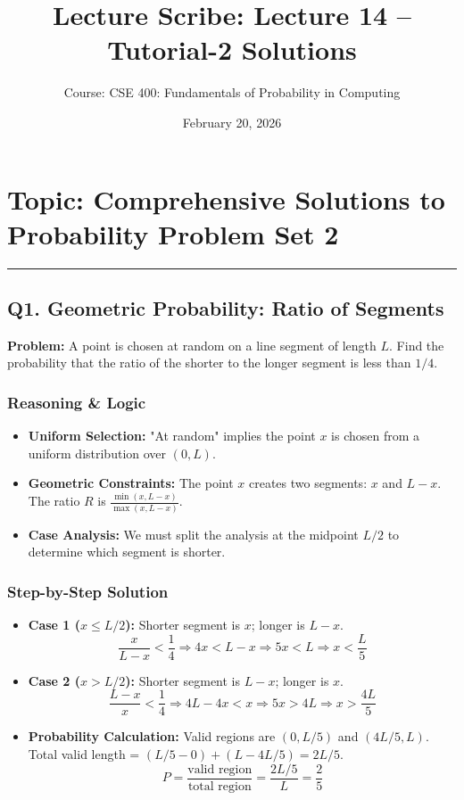 \documentclass[11pt]{article}
\title{Lecture Scribe: Lecture 14 – Tutorial-2 Solutions}
\author{Course: CSE 400: Fundamentals of Probability in Computing}
\date{February 20, 2026}
\begin{document}
\maketitle

\section*{Topic: Comprehensive Solutions to Probability Problem Set 2}
\hrule
\vspace{0.5cm}

\subsection*{Q1. Geometric Probability: Ratio of Segments}

\textbf{Problem:} A point is chosen at random on a line segment of length $L$. Find the probability that the ratio of the shorter to the longer segment is less than $1/4$.

\subsubsection*{Reasoning \& Logic}
\begin{itemize}
    \item \textbf{Uniform Selection:} "At random" implies the point $x$ is chosen from a uniform distribution over $(0, L)$.
    \item \textbf{Geometric Constraints:} The point $x$ creates two segments: $x$ and $L-x$. The ratio $R$ is $\frac{\min(x, L-x)}{\max(x, L-x)}$.
    \item \textbf{Case Analysis:} We must split the analysis at the midpoint $L/2$ to determine which segment is shorter.
\end{itemize}

\subsubsection*{Step-by-Step Solution}
\begin{itemize}
    \item \textbf{Case 1 ($x \le L/2$):} Shorter segment is $x$; longer is $L-x$. 
    \[ \frac{x}{L-x} < \frac{1}{4} \Rightarrow 4x < L - x \Rightarrow 5x < L \Rightarrow x < \frac{L}{5} \]
    \item \textbf{Case 2 ($x > L/2$):} Shorter segment is $L-x$; longer is $x$. 
    \[ \frac{L-x}{x} < \frac{1}{4} \Rightarrow 4L - 4x < x \Rightarrow 5x > 4L \Rightarrow x > \frac{4L}{5} \]
    \item \textbf{Probability Calculation:} Valid regions are $(0, L/5)$ and $(4L/5, L)$. Total valid length = $(L/5 - 0) + (L - 4L/5) = 2L/5$. 
    \[ P = \frac{\text{valid region}}{\text{total region}} = \frac{2L/5}{L} = \frac{2}{5} \]
\end{itemize}
\end{document}
